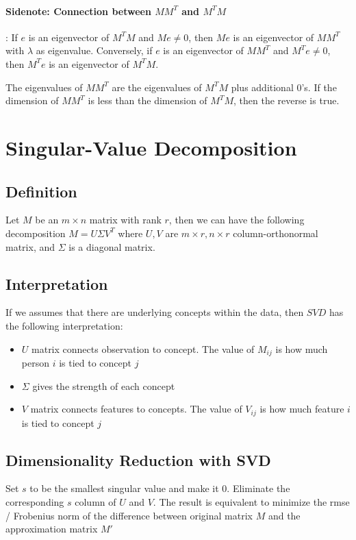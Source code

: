\paragraph{Sidenote: Connection between $MM^T$ and $M^TM$} : If $e$ is an eigenvector of $M^TM$ and $Me \neq 0$, then $Me$ is an eigenvector of $MM^T$ with $\lambda$ as eigenvalue. Conversely, if $e$ is an eigenvector of $MM^T$ and $M^Te \neq 0$, then $M^Te$ is an eigenvector of $M^TM$. 

The eigenvalues of $MM^T$ are the eigenvalues of $M^TM$ plus additional 0's. If the dimension of $MM^T$ is less than the dimension of $M^TM$, then the reverse is true. 


\section{Singular-Value Decomposition} 
\subsection{Definition}
Let $M$ be an $m\times n$ matrix with rank $r$, then we can have the following decomposition $M = U\Sigma V^T$ where $U,V$ are $m\times r, n \times r$ column-orthonormal matrix, and $\Sigma$ is a diagonal matrix. 

\subsection{Interpretation} 
If we assumes that there are underlying concepts within the data, then $SVD$ has the following interpretation: 
    \begin{itemize}
        \item $U$ matrix connects observation to concept. The value of $M_{ij}$ is how much person $i$ is tied to concept $j$
        \item $\Sigma$ gives the strength of each concept
        \item $V$ matrix connects features to concepts.  The value of $V_{ij}$ is how much feature $i$ is tied to concept $j$
    \end{itemize}
    
\subsection{Dimensionality Reduction with SVD}
Set $s$ to be the smallest singular value and make it 0. Eliminate the corresponding $s$ column of $U$ and $V$. The result is equivalent to minimize the rmse / Frobenius norm of the difference between original matrix $M$ and the approximation matrix $M'$

